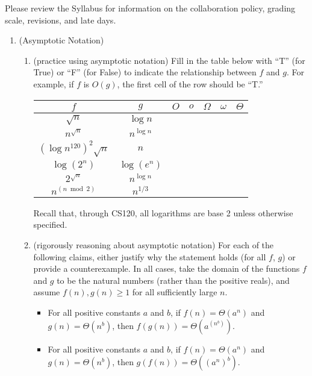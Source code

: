\documentclass[11pt]{article}
\begin{document}

Please review the Syllabus for information on the collaboration policy, grading scale, revisions, and late days.


\begin{enumerate}
    \item (Asymptotic Notation) 
    \begin{enumerate}
    \item (practice using asymptotic notation)
        Fill in the table below with ``T'' (for True) or ``F'' (for False) to indicate the relationship between $f$ and $g$. For example, if $f$ is $O(g)$, the first cell of the row should be ``T.'' \\
        \begin{table}[h!]
        \centering
        \bgroup
        \def\arraystretch{1.3}
        \begin{tabular}{||c | c || c | c | c | c | c ||}
         \hline
         $f$ & $g$ & $O$ & $o$ & $\Omega$ & $\omega$ & $\Theta$ \\
         \hline\hline
         $\sqrt{n}$ & $\log n$ & & & & & \\ \hline
         $n^{\sqrt{n}}$ & $n^{\log n}$ & & & & & \\ \hline
         $(\log {n^{120}})^2\sqrt{n}$ & $n$ & & & & & \\ \hline
         $\log(2^n)$ & $\log(e^n)$ & & & & & \\ \hline
         $2^\sqrt{n}$ & $n^{\log n}$ & & & & & \\ \hline
         $n^{(n \bmod 2)}$ & $n^{1/3}$ & & & & & \\ \hline
        \end{tabular}
        \egroup
        \end{table}
        Recall that, through CS120, all logarithms are base 2 unless otherwise specified. 
        
    \item  (rigorously reasoning about asymptotic notation)  
    For each of the following claims, either justify why the statement holds (for all $f$, $g$) or provide a counterexample. In all cases, take the domain of the functions $f$ and $g$ to be the natural numbers (rather than the positive reals), and assume $f(n), g(n)\geq 1$ for all sufficiently large $n$.
    \begin{itemize}
        \item For all positive constants $a$ and $b$, if $f(n) = \Theta(a^n)$ and $g(n) = \Theta(n^b)$, then $f(g(n)) = \Theta(a^{(n^b)})$.
        \item For all positive constants $a$ and $b$, if $f(n) = \Theta(a^n)$ and $g(n) = \Theta(n^b)$, then $g(f(n)) = \Theta((a^n)^b)$.
    \end{itemize}
  

\end{enumerate}
\end{enumerate}
\end{document}
